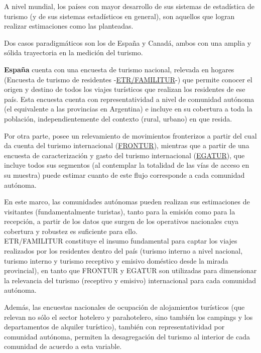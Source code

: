 \documentclass[
  openany]{book}
\begin{document}
A nivel mundial, los países con mayor desarrollo de sus sistemas de estadística de turismo (y de sus sistemas estadísticos en general), son aquellos que logran realizar estimaciones como las planteadas.

Dos casos paradigmáticos son los de España y Canadá, ambos con una amplia y sólida trayectoria en la medición del turismo.

\textbf{España} cuenta con una encuesta de turismo nacional, relevada en hogares (Encuesta de turismo de residentes -\href{https://www.ine.es/dyngs/INEbase/es/operacion.htm?c=Estadistica_C\&cid=1254736176990\&menu=ultiDatos\&idp=1254735576863}{ETR/FAMILITUR}-) que permite conocer el origen y destino de todos los viajes turísticos que realizan los residentes de ese país. Esta encuesta cuenta con representatividad a nivel de comunidad autónoma (el equivalente a las provincias en Argentina) e incluye en su cobertura a toda la población, independientemente del contexto (rural, urbano) en que resida.

Por otra parte, posee un relevamiento de movimientos fronterizos a partir del cual da cuenta del turismo internacional (\href{https://www.ine.es/dyngs/INEbase/es/operacion.htm?c=Estadistica_C\&cid=1254736176996\&menu=ultiDatos\&idp=1254735576863}{FRONTUR}), mientras que a partir de una encuesta de caracterización y gasto del turismo internacional (\href{https://www.ine.es/dyngs/INEbase/es/operacion.htm?c=Estadistica_C\&cid=1254736177002\&menu=ultiDatos\&idp=1254735576863}{EGATUR}), que incluye todos sus segmentos (al contemplar la totalidad de las vías de acceso en su muestra) puede estimar cuanto de este flujo corresponde a cada comunidad autónoma.

En este marco, las comunidades autónomas pueden realizan sus estimaciones de visitantes (fundamentalmente turistas), tanto para la emisión como para la recepción, a partir de los datos que surgen de los operativos nacionales cuya cobertura y robustez es suficiente para ello.\\
ETR/FAMILITUR constituye el insumo fundamental para captar los viajes realizados por los residentes dentro del país (turismo interno a nivel nacional, turismo interno y turismo receptivo y emisivo doméstico desde la mirada provincial), en tanto que FRONTUR y EGATUR son utilizadas para dimensionar la relevancia del turismo (receptivo y emisivo) internacional para cada comunidad autónoma.

Además, las encuestas nacionales de ocupación de alojamientos turísticos (que relevan no sólo el sector hotelero y parahotelero, sino también los campings y los departamentos de alquiler turístico), también con representatividad por comunidad autónoma, permiten la desagregación del turismo al interior de cada comunidad de acuerdo a esta variable.
\end{document}

